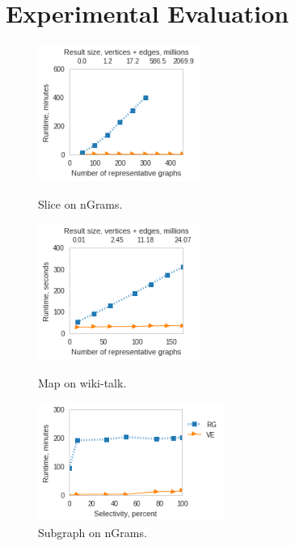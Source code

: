 \section{Experimental Evaluation}
\label{sec:exp}

\begin{figure}[t]
\vspace{-0.2in}
\centering
\begin{minipage}[b]{2.1in}
\centering
\includegraphics[width=2.1in]{figs/slice_ngrams_build13.png}
\vspace{-0.2in}
\caption{Slice on nGrams.}
\label{fig:slicengrams}
\vspace{-0.1in}
\end{minipage}
\begin{minipage}[b]{2.1in}
\centering
\includegraphics[width=2.1in]{figs/project_wikitalk_build13.png}
\vspace{-0.2in}
\caption{Map on wiki-talk.}
\label{fig:project}
\vspace{-0.1in}
\end{minipage}
\begin{minipage}[b]{2.2in}
\centering
\includegraphics[width=2.4in]{figs/subgraph_ngrams_build13.png}
\vspace{-0.2in}
\caption{Subgraph on nGrams.}
\label{fig:subgraphngrams}
\vspace{-0.1in}
\end{minipage}
\end{figure}

